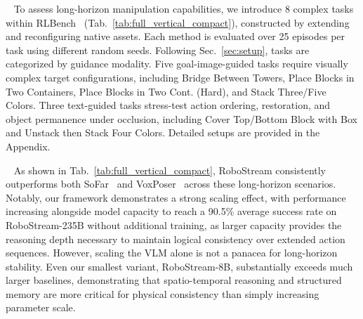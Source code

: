 ~
To assess long-horizon manipulation capabilities, we introduce 8 complex tasks within RLBench~\cite{james2020rlbench} (Tab.~\ref{tab:full_vertical_compact}), constructed by extending and reconfiguring native assets. Each method is evaluated over 25 episodes per task using different random seeds. Following Sec.~\ref{sec:setup}, tasks are categorized by guidance modality. Five goal-image-guided tasks require visually complex target configurations, including Bridge Between Towers, Place Blocks in Two Containers, Place Blocks in Two Cont. (Hard), and Stack Three/Five Colors. Three text-guided tasks stress-test action ordering, restoration, and object permanence under occlusion, including Cover Top/Bottom Block with Box and Unstack then Stack Four Colors. Detailed setups are provided in the Appendix.

~
As shown in Tab.~\ref{tab:full_vertical_compact}, RoboStream consistently outperforms both SoFar~\cite{qisofar} and VoxPoser~\cite{huang2023voxposer} across these long-horizon scenarios. Notably, our framework demonstrates a strong scaling effect, with performance increasing alongside model capacity to reach a 90.5\% average success rate on RoboStream-235B without additional training, as larger capacity provides the reasoning depth necessary to maintain logical consistency over extended action sequences. However, scaling the VLM alone is not a panacea for long-horizon stability. Even our smallest variant, RoboStream-8B, substantially exceeds much larger baselines, demonstrating that spatio-temporal reasoning and structured memory are more critical for physical consistency than simply increasing parameter scale.










